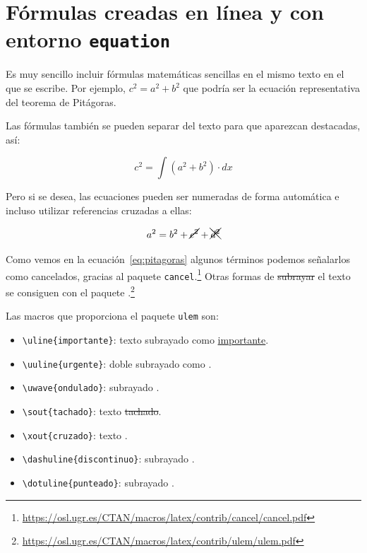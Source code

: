 \documentclass[ 		%
	11pt,				%
	a4paper,			%
	twoside,			%
	openright,			%
	final       		%
]{book}
\begin{document}
\section{Fórmulas creadas en línea y con entorno \texttt{equation}}
Es muy sencillo incluir fórmulas matemáticas sencillas en el mismo texto en el que se escribe. Por ejemplo, $c^{2}=a^{2}+b^{2}$ que podría ser la ecuación representativa del teorema de Pitágoras.

Las fórmulas también se pueden separar del texto para que aparezcan destacadas, así:

\[
c^2  = \int {\left( {a^2  + b^2} \right)}  \cdot dx
\]


Pero si se desea, las ecuaciones pueden ser numeradas de forma automática e incluso utilizar referencias cruzadas a ellas:

\begin{equation} \label{eq:pitagoras}
	a^{2}=b^{2} + \cancel{c^{2}}+ \xcancel{d^{2}}
\end{equation}

Como vemos en la ecuación~\ref{eq:pitagoras} algunos términos podemos señalarlos como cancelados, gracias al paquete \texttt{cancel}.\footnote{\url{https://osl.ugr.es/CTAN/macros/latex/contrib/cancel/cancel.pdf}} Otras formas de \sout{subrayar} el texto se consiguen con el paquete .\footnote{\url{https://osl.ugr.es/CTAN/macros/latex/contrib/ulem/ulem.pdf}}

\bigskip
Las macros que proporciona el paquete \texttt{ulem} son:
\begin{itemize}[noitemsep]
	\item \verb|\uline{importante}|: texto subrayado como \uline{importante}.
	
	\item \verb||: doble subrayado como \uuline{urgente}.
	
	\item \verb||: subrayado \uwave{ondulado}.
	 
	\item \verb|\sout{tachado}|: texto \sout{tachado}.
	
	\item \verb||: texto \xout{cruzado}.
	
	\item \verb||: subrayado \dashuline{discontinuo}.
	 
	\item \verb||: subrayado \dotuline{punteado}.
\end{itemize}
\bigskip
\end{document}
